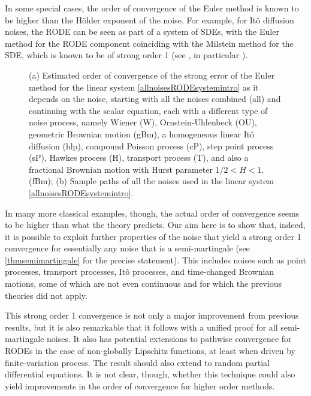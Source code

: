 \documentclass[reqno,12pt]{amsart}
\theoremstyle{plain} %
\theoremstyle{definition} %
\begin{document}
In some special cases, the order of convergence of the Euler method is known to be higher than the H\"older exponent of the noise. For example, for It\^o diffusion noises, the RODE can be seen as part of a system of SDEs, with the Euler method for the RODE component coinciding with the Milstein method for the SDE, which is known to be of strong order 1 (see \cite[Section 5]{WangCaoHanKloeden2021}, in particular \cite[Section 5.2, Example 12 and Remark 13]{WangCaoHanKloeden2021}).

\begin{figure}[htb]
    \caption{(a) Estimated order of convergence of the strong error of the Euler method for the linear system \cref{allnoisesRODEsystemintro} as it depends on the noise, starting with all the noises combined (all) and continuing with the scalar equation, each with a different type of noise process, namely Wiener (W), Ornstein-Uhlenbeck (OU), geometric Brownian motion (gBm), a homogeneous linear It\^o diffusion (hlp), compound Poisson process (cP), step point process (sP), Hawkes process (H), transport process (T), and also a fractional Brownian motion with Hurst parameter $1/2 < H < 1.$ (fBm); (b) Sample paths of all the noises used in the linear system \cref{allnoisesRODEsystemintro}.}
    \label{figallnoisesintro}
\end{figure}

In many more classical examples, though, the actual order of convergence seems to be higher than what the theory predicts. Our aim here is to show that, indeed, it is possible to exploit further properties of the noise that yield a strong order 1 convergence for essentially any noise that is a semi-martingale (see \cref{thmsemimartingale} for the precise statement). This includes noises such as point processes, transport processes, It\^o processes, and time-changed Brownian motions, some of which are not even continuous and for which the previous theories did not apply.

This strong order 1 convergence is not only a major improvement from previous results, but it is also remarkable that it follows with a unified proof for all semi-martingale noises. It also has potential extensions to pathwise convergence for RODEs in the case of non-globally Lipschitz functions, at least when driven by finite-variation process. The result should also extend to random partial differential equations. It is not clear, though, whether this technique could also yield improvements in the order of convergence for higher order methods.
\end{document}
